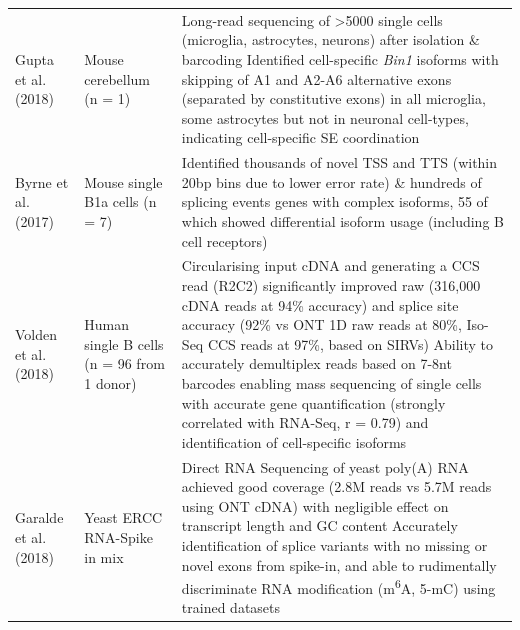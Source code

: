 \begin{changemargin}{1.5cm}
\begin{landscape}
\begin{longtable}[c]{p{4cm}p{4cm}p{18cm}}
			\centering Gupta et al.(2018) \cite{Gupta2018} &
			\centering Mouse cerebellum (n = 1)  &
			\tabitem Long-read sequencing of >5000 single cells (microglia, astrocytes, neurons) after isolation \& barcoding \newline 
			\tabitem Identified cell-specific \textit{Bin1} isoforms with skipping of A1 and A2-A6 alternative exons (separated by constitutive exons) in all microglia, some astrocytes but not in neuronal cell-types, indicating cell-specific SE coordination \\
			\hdashline[0.5pt/5pt]			
			
			\centering Byrne et al. (2017)\cite{Byrne2017} &
			\centering Mouse single B1a cells (n = 7) &
			\tabitem Identified thousands of novel TSS and TTS (within 20bp bins due to lower error rate) \& hundreds of splicing events \newline
			\tabitem 160 genes with complex isoforms, 55 of which showed differential isoform usage (including B cell receptors) \\
			\hdashline[0.5pt/5pt]
			
			\centering Volden et al. (2018) \cite{Volden2018} &
			\centering Human single B cells (n = 96 from 1 donor) &
			\tabitem Circularising input cDNA and generating a CCS read (R2C2) significantly improved raw (316,000 cDNA reads at 94\% accuracy) and splice site accuracy (92\% vs ONT 1D raw reads at 80\%, Iso-Seq CCS reads at 97\%, based on SIRVs) \newline 
			\tabitem Ability to accurately demultiplex reads based on 7-8nt barcodes enabling mass sequencing of single cells with accurate gene quantification (strongly correlated with RNA-Seq, r = 0.79) and identification of cell-specific isoforms \\
			\hdashline[0.5pt/5pt]
			
			
			\centering Garalde et al. (2018) \cite{Garalde2018} &
			\centering Yeast \newline ERCC RNA-Spike in mix &
			\tabitem Direct RNA Sequencing of yeast poly(A) RNA achieved good coverage (2.8M reads vs 5.7M reads using ONT cDNA) with negligible effect on transcript length and GC content \newline 
			\tabitem Accurately identification of splice variants with no missing or novel exons from spike-in, and able to rudimentally discriminate RNA modification (m\textsuperscript{6}A, 5-mC) using trained datasets  \\
			

\end{longtable}
\end{landscape}
\end{changemargin}
